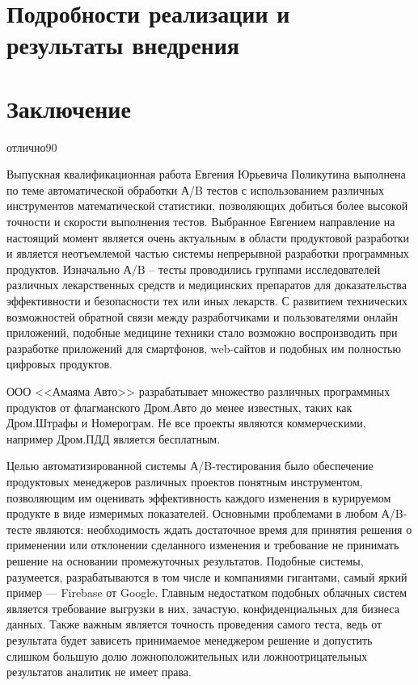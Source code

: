 \documentclass{fefu}
\begin{document}
    \section{Подробности реализации и результаты внедрения}
    
    \newpage
    \section*{Заключение}
    
    \newpage
    \printbibliography
    \newpage
    \begin{supervisorreview}{отлично}{90}{}
    	\par Выпускная квалификационная работа Евгения Юрьевича Поликутина выполнена по теме автоматической обработки А/B тестов с использованием различных инструментов математической статистики, позволяющих добиться более высокой точности и скорости выполнения тестов. Выбранное Евгением направление на настоящий момент является очень актуальным в области продуктовой разработки и является неотъемлемой частью системы непрерывной разработки программных продуктов. Изначально А/B – тесты проводились группами исследователей различных лекарственных средств и медицинских препаратов для доказательства эффективности и безопасности тех или иных лекарств. С развитием технических возможностей обратной связи между разработчиками и пользователями онлайн приложений, подобные медицине техники стало возможно воспроизводить при разработке приложений для смартфонов, web-сайтов и подобных им полностью цифровых продуктов.
    	\par ООО <<Амаяма Авто>> разрабатывает множество различных программных продуктов от флагманского Дром.Авто до менее известных, таких как Дром.Штрафы и Номерограм. Не все проекты являются коммерческими, например Дром.ПДД является бесплатным.
    	\par Целью автоматизированной системы А/B-тестирования было обеспечение продуктовых менеджеров различных проектов понятным инструментом, позволяющим им оценивать эффективность каждого изменения в курируемом продукте в виде измеримых показателей. Основными проблемами в любом А/B-тесте являются: необходимость ждать достаточное время для принятия решения о применении или отклонении сделанного изменения и требование не принимать решение на основании промежуточных результатов. Подобные системы, разумеется, разрабатываются в том числе и компаниями гигантами, самый яркий пример — Firebase от Google. Главным недостатком подобных облачных систем является требование выгрузки в них, зачастую, конфиденциальных для бизнеса данных. Также важным является точность проведения самого теста, ведь от результата будет зависеть принимаемое менеджером решение и допустить слишком большую долю ложноположительных или ложноотрицательных результатов аналитик не имеет права.

\end{supervisorreview}
\end{document}
